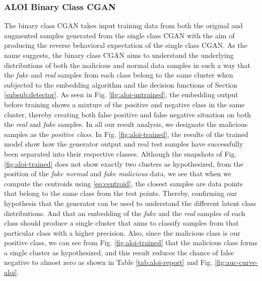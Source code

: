 \subsubsection{ALOI Binary Class CGAN}
\label{subsub:aloibcgresults}
The binary class CGAN takes input training data from both the original and augmented samples generated from the single class CGAN with the aim of producing the reverse behavioral expectation of the single class CGAN. As the name suggests, the binary class CGAN aims to understand the underlying distributions of both the malicious and normal data samples in such a way that the \textit{fake} and \textit{real} samples from each class belong to the same cluster when subjected to the embedding algorithm and the decision functions of Section \ref{subsub:detector}. As seen in Fig. \ref{fig:aloi-untrained}, the embedding output before training shows a mixture of the positive and negative class in the same cluster, thereby creating both false positive and false negative situation on both the \textit{real} and \textit{fake} samples. In all our result analysis, we designate the malicious samples as the \textit{positive class}. In Fig. \ref{fig:aloi-trained}, the results of the trained model show how the generator output and real test samples have successfully been separated into their respective classes. Although the snapshots of Fig. \ref{fig:aloi-trained} does not show exactly two clusters as hypothesized, from the position of the \textit{fake normal} and \textit{fake malicious} data, we see that when we compute the centroids using \eqref{eq:centroid}, the closest samples are data points that belong to the same class from the test points. Thereby, confirming our hypothesis that the generator can be used to understand the different latent class distributions. And that an embedding of the \textit{fake} and the \textit{real} samples of each class should produce a single cluster that aims to classify samples from that particular class with a higher precision. Also, since the malicious class is our positive class, we can see from Fig. \ref{fig:aloi-trained} that the malicious class forms a single cluster as hypothesized, and this result reduces the chance of false negative to almost zero as shown in Table \ref{tab:aloi-report} and Fig. \ref{fig:auc-curve-aloi}.
